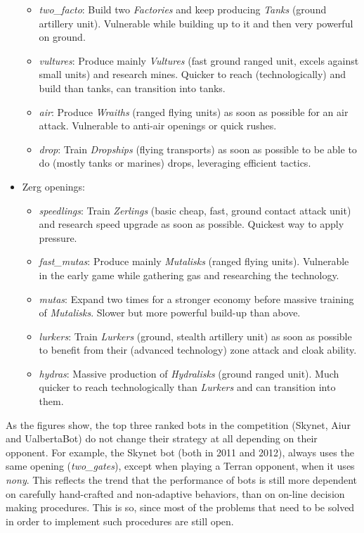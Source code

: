 \documentclass[journal]{IEEEtran}
\begin{document}
\begin{itemize}
\begin{itemize}
    \item \emph{two\_facto}: Build two \emph{Factories} and keep producing \emph{Tanks} (ground artillery unit). Vulnerable while building up to it and then very powerful on ground.
    \item \emph{vultures}: Produce mainly \emph{Vultures} (fast ground ranged unit, excels against small units) and research mines. Quicker to reach (technologically) and build than tanks, can transition into tanks.
    \item \emph{air}: Produce \emph{Wraiths} (ranged flying units) as soon as possible for an air attack. Vulnerable to anti-air openings or quick rushes.
    \item \emph{drop}: Train \emph{Dropships} (flying transports) as soon as possible to be able to do (mostly tanks or marines) drops, leveraging efficient tactics.
  \end{itemize}
  \item Zerg openings:
  \begin{itemize}
    \item \emph{speedlings}: Train \emph{Zerlings} (basic cheap, fast, ground contact attack unit) and research speed upgrade as soon as possible. Quickest way to apply pressure.
    \item \emph{fast\_mutas}: Produce mainly \emph{Mutalisks} (ranged flying units). Vulnerable in the early game while gathering gas and researching the technology.
    \item \emph{mutas}: Expand two times for a stronger economy before massive training of \emph{Mutalisks}. Slower but more powerful build-up than above.
    \item \emph{lurkers}: Train \emph{Lurkers} (ground, stealth artillery unit) as soon as possible to benefit from their (advanced technology) zone attack and cloak ability. 
    \item \emph{hydras}: Massive production of \emph{Hydralisks} (ground ranged unit). Much quicker to reach technologically than \emph{Lurkers} and can transition into them.
  \end{itemize}
\end{itemize}

As the figures show, the top three ranked bots in the competition (Skynet, Aiur and UalbertaBot) do not change their strategy at all depending on their opponent. For example, the Skynet bot (both in 2011 and 2012), always uses the same opening (\emph{two\_gates}), except when playing a Terran opponent, when it uses \emph{nony}. This reflects the trend that the performance of bots is still more dependent on carefully hand-crafted and non-adaptive behaviors, than on on-line decision making procedures. This is so, since most of the problems that need to be solved in order to implement such procedures are still open.
\end{document}
